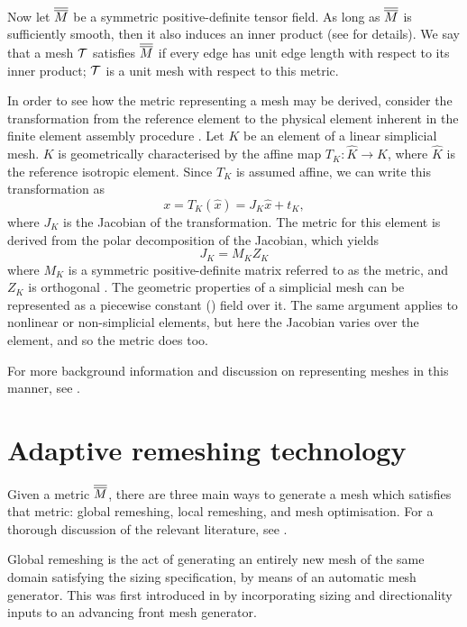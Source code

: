 Now let $\overline{\overline{M}}$ be a symmetric positive-definite tensor field. As long as
$\overline{\overline{M}}$ is sufficiently smooth, then it also induces an inner product
(see \citet{simpson1994} for details). We say that a mesh $\cal{T}$ satisfies
$\overline{\overline{M}}$ if every edge has unit edge length with respect to its inner product;
$\cal{T}$ is a unit mesh with respect to this metric.

In order to see how the metric representing a mesh may be derived, consider the transformation from the reference element to the physical
element inherent in the finite element assembly procedure \citep{femtools}.
Let $K$ be an element of a linear simplicial mesh. $K$ is geometrically characterised by the affine map
$T_K: \hat{K} \rightarrow K$, where $\hat{K}$ is the reference isotropic element. Since
$T_K$ is assumed affine, we can write this transformation as
\begin{equation}
x = T_K(\hat{x}) = J_K\hat{x} + t_K,
\end{equation}
where $J_K$ is the Jacobian of the transformation. The metric for this element is derived
from the polar decomposition of the Jacobian, which yields
\begin{equation}
J_K = M_K Z_K
\end{equation}
where $M_K$ is a symmetric positive-definite matrix referred to as the metric,
and $Z_K$ is orthogonal \citep{micheletti2006}. The geometric properties of a simplicial mesh can be represented
as a piecewise constant (\Pzero) field over it. The same argument applies to
nonlinear or non-simplicial elements, but here the Jacobian varies over the element,
and so the metric does too.

For more background information and discussion on representing meshes in this manner,
see \citet{george1998}.

\section{Adaptive remeshing technology} \label{sec:adaptive_remeshing_technology}
Given a metric $\overline{\overline{M}}$, there are three main ways to generate a mesh which satisfies
that metric: global remeshing, local remeshing, and mesh optimisation. For a thorough discussion
of the relevant literature, see \citet{farrell2009i}.

Global remeshing is the act of generating an entirely new mesh of the same domain satisfying the sizing
specification, by means of an automatic mesh generator. This was first introduced in \citet{peraire1987} by incorporating
sizing and directionality inputs to an advancing front mesh generator.


